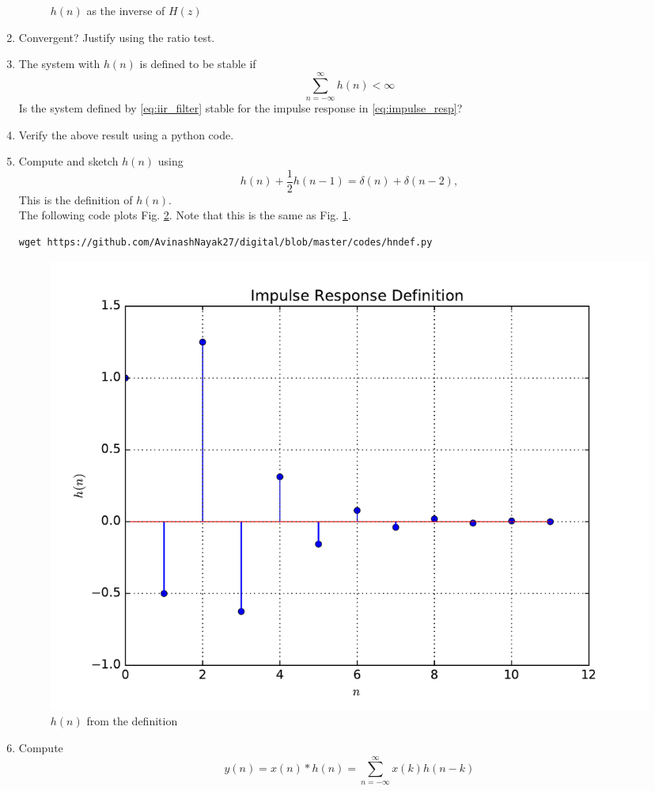 \documentclass[journal,12pt,twocolumn]{IEEEtran}
\renewcommand\thesection{\arabic{section}}
\begin{document}
\begin{enumerate}[label=\thesection.\arabic*]
\begin{figure}[!ht]
\caption{$h(n)$ as the inverse of $H(z)$}
\label{fig:hn}
\end{figure}
%
\item Convergent? Justify using the ratio test.
\item The system with $h(n)$ is defined to be stable if
\begin{equation}
\sum_{n=-\infty}^{\infty}h(n) < \infty
\end{equation}
Is the system defined by \eqref{eq:iir_filter} stable for the impulse response in \eqref{eq:impulse_resp}?
%
\item Verify the above result using a python code.
\item 
Compute and sketch $h(n)$ using 
\begin{equation}
\label{eq:iir_filter_h}
h(n) + \frac{1}{2}h(n-1) = \delta(n) + \delta(n-2), 
\end{equation}
%
This is the definition of $h(n)$.
\\
\solution The following code plots Fig. \ref{fig:hndef}. Note that this is the same as Fig. 
\ref{fig:hn}. 
%
\begin{lstlisting}
wget https://github.com/AvinashNayak27/digital/blob/master/codes/hndef.py
\end{lstlisting}
\begin{figure}[!ht]
\centering
\includegraphics[width=\columnwidth]{./figs/hndef}
\caption{$h(n)$ from the definition}
\label{fig:hndef}
\end{figure}
%
\item Compute 
%
\begin{equation}
\label{eq:convolution}
y(n) = x(n)*h(n) = \sum_{n=-\infty}^{\infty}x(k)h(n-k)

\end{equation}
\end{enumerate}
\end{document}
